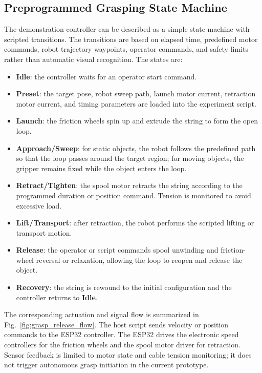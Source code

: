 \subsection{Preprogrammed Grasping State Machine}
The demonstration controller can be described as a simple state machine with scripted transitions. The transitions are based on elapsed time, predefined motor commands, robot trajectory waypoints, operator commands, and safety limits rather than automatic visual recognition. The states are:
\begin{itemize}
    \item \textbf{Idle}: the controller waits for an operator start command.
    \item \textbf{Preset}: the target pose, robot sweep path, launch motor current, retraction motor current, and timing parameters are loaded into the experiment script.
    \item \textbf{Launch}: the friction wheels spin up and extrude the string to form the open loop.
    \item \textbf{Approach/Sweep}: for static objects, the robot follows the predefined path so that the loop passes around the target region; for moving objects, the gripper remains fixed while the object enters the loop.
    \item \textbf{Retract/Tighten}: the spool motor retracts the string according to the programmed duration or position command. Tension is monitored to avoid excessive load.
    \item \textbf{Lift/Transport}: after retraction, the robot performs the scripted lifting or transport motion.
    \item \textbf{Release}: the operator or script commands spool unwinding and friction-wheel reversal or relaxation, allowing the loop to reopen and release the object.
    \item \textbf{Recovery}: the string is rewound to the initial configuration and the controller returns to \textbf{Idle}.
\end{itemize}

The corresponding actuation and signal flow is summarized in Fig.~\ref{fig:grasp_release_flow}. The host script sends velocity or position commands to the ESP32 controller. The ESP32 drives the electronic speed controllers for the friction wheels and the spool motor driver for retraction. Sensor feedback is limited to motor state and cable tension monitoring; it does not trigger autonomous grasp initiation in the current prototype.

